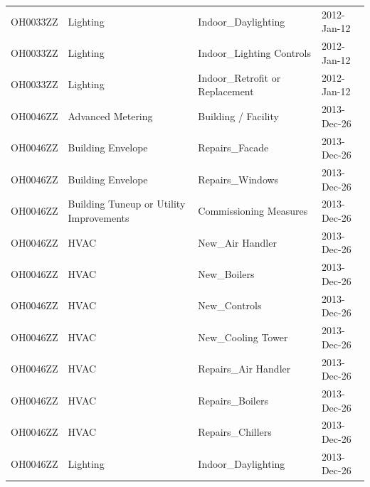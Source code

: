 \documentclass[12pt]{article}
\begin{document}
\begin{longtable}{lp{4cm}p{4cm}p{3cm}}
OH0033ZZ         & Lighting                                & Indoor\_Daylighting                       & 2012-Jan-12                   \\
OH0033ZZ         & Lighting                                & Indoor\_Lighting Controls                 & 2012-Jan-12                   \\
OH0033ZZ         & Lighting                                & Indoor\_Retrofit or Replacement           & 2012-Jan-12                   \\
OH0046ZZ         & Advanced Metering                       & Building / Facility                       & 2013-Dec-26                   \\
OH0046ZZ         & Building Envelope                       & Repairs\_Facade                           & 2013-Dec-26                   \\
OH0046ZZ         & Building Envelope                       & Repairs\_Windows                          & 2013-Dec-26                   \\
OH0046ZZ         & Building Tuneup or Utility Improvements & Commissioning Measures                    & 2013-Dec-26                   \\
OH0046ZZ         & HVAC                                    & New\_Air Handler                          & 2013-Dec-26                   \\
OH0046ZZ         & HVAC                                    & New\_Boilers                              & 2013-Dec-26                   \\
OH0046ZZ         & HVAC                                    & New\_Controls                             & 2013-Dec-26                   \\
OH0046ZZ         & HVAC                                    & New\_Cooling Tower                        & 2013-Dec-26                   \\
OH0046ZZ         & HVAC                                    & Repairs\_Air Handler                      & 2013-Dec-26                   \\
OH0046ZZ         & HVAC                                    & Repairs\_Boilers                          & 2013-Dec-26                   \\
OH0046ZZ         & HVAC                                    & Repairs\_Chillers                         & 2013-Dec-26                   \\
OH0046ZZ         & Lighting                                & Indoor\_Daylighting                       & 2013-Dec-26                   \\

\end{longtable}
\end{document}

